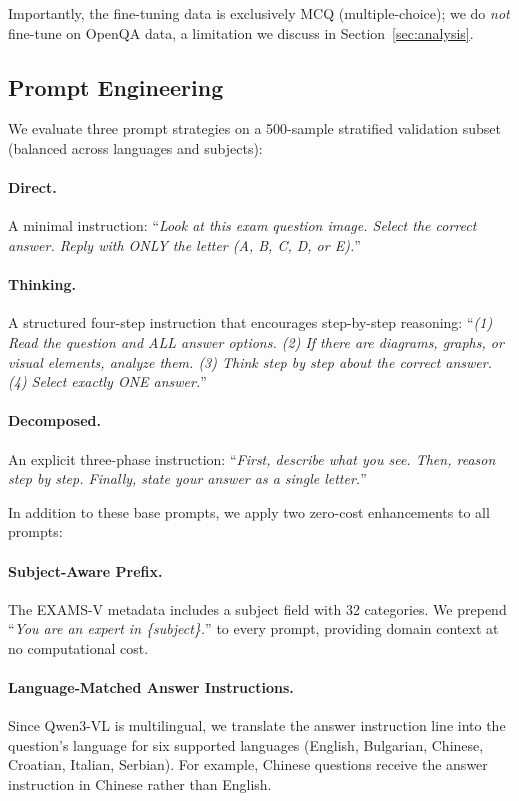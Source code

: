 \documentclass[]{ceurart}
\begin{document}
Importantly, the fine-tuning data is exclusively MCQ (multiple-choice); we do \textit{not} fine-tune on OpenQA data, a limitation we discuss in Section~\ref{sec:analysis}.

\subsection{Prompt Engineering}
\label{sec:prompts}

We evaluate three prompt strategies on a 500-sample stratified validation subset (balanced across languages and subjects):

\paragraph{Direct.} A minimal instruction: ``\textit{Look at this exam question image. Select the correct answer. Reply with ONLY the letter (A, B, C, D, or E).}''

\paragraph{Thinking.} A structured four-step instruction that encourages step-by-step reasoning:
``\textit{(1) Read the question and ALL answer options. (2) If there are diagrams, graphs, or visual elements, analyze them. (3) Think step by step about the correct answer. (4) Select exactly ONE answer.}''

\paragraph{Decomposed.} An explicit three-phase instruction: ``\textit{First, describe what you see. Then, reason step by step. Finally, state your answer as a single letter.}''

In addition to these base prompts, we apply two zero-cost enhancements to all prompts:

\paragraph{Subject-Aware Prefix.}
The EXAMS-V metadata includes a subject field with 32 categories.
We prepend ``\textit{You are an expert in \{subject\}.}'' to every prompt, providing domain context at no computational cost.

\paragraph{Language-Matched Answer Instructions.}
Since Qwen3-VL is multilingual, we translate the answer instruction line into the question's language for six supported languages (English, Bulgarian, Chinese, Croatian, Italian, Serbian).
For example, Chinese questions receive the answer instruction in Chinese rather than English.
\end{document}

